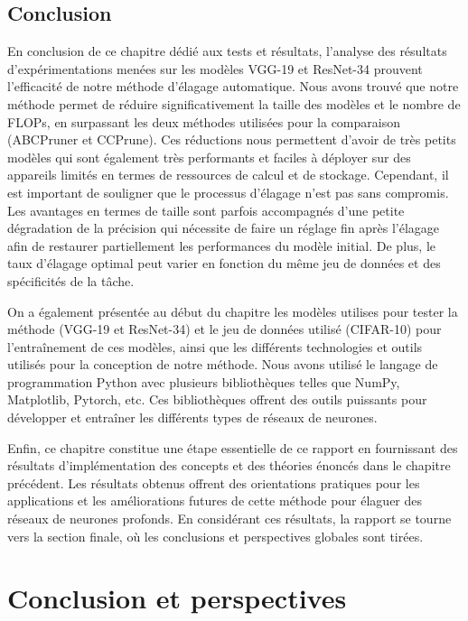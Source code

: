 \section{Conclusion}
En conclusion de ce chapitre dédié aux tests et résultats, l'analyse des résultats d'expérimentations menées sur les modèles VGG-19 et ResNet-34 prouvent l'efficacité de notre méthode d'élagage automatique. Nous avons trouvé que notre méthode permet de réduire significativement la taille des modèles et le nombre de FLOPs, en surpassant les deux méthodes utilisées pour la comparaison (ABCPruner et CCPrune). Ces réductions nous permettent d'avoir de très petits modèles qui sont également très performants et faciles à déployer sur des appareils limités en termes de ressources de calcul et de stockage. Cependant, il est important de souligner que le processus d'élagage n'est pas sans compromis. Les avantages en termes de taille sont parfois accompagnés d'une petite dégradation de la précision qui nécessite de faire un réglage fin après l'élagage afin de restaurer partiellement les performances du modèle initial. De plus, le taux d'élagage optimal peut varier en fonction du même jeu de données et des spécificités de la tâche.

On a également présentée au début du chapitre les modèles utilises pour tester la méthode (VGG-19 et ResNet-34) et le jeu de données utilisé (CIFAR-10) pour l'entraînement de ces modèles, ainsi que les différents technologies et outils utilisés pour la conception de notre méthode. Nous avons utilisé le langage de programmation Python avec plusieurs bibliothèques telles que NumPy, Matplotlib, Pytorch, etc. Ces bibliothèques offrent des outils puissants pour développer et entraîner les différents types de réseaux de neurones.

Enfin, ce chapitre constitue une étape essentielle de ce rapport en fournissant des résultats d'implémentation des concepts et des théories énoncés dans le chapitre précédent. Les résultats obtenus offrent des orientations pratiques pour les applications et les améliorations futures de cette méthode pour élaguer des réseaux de neurones profonds. En considérant ces résultats, la rapport se tourne vers la section finale, où les conclusions et perspectives globales sont tirées.

\chapter*{Conclusion et perspectives}
\label{chap:conclusion}

